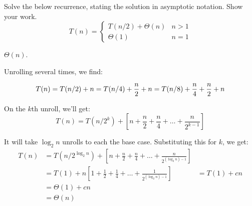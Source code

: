 \begin{prob}
    Solve the below recurrence, stating the solution in asymptotic notation. Show your work.
    \[
        T(n) =
        \begin{cases}
            T(n/2) + \Theta(n) & n > 1 \\
            \Theta(1) & n = 1
        \end{cases}
    \]

    \begin{soln}
        $\Theta(n)$.

        Unrolling several times, we find:

        \[
            T(n)
            =
                T(n/2) + n
                \\
            =
                T(n/4) + \frac{n}{2} + n
                \\
            =
                T(n/8) + \frac{n}{4} + \frac{n}{2} + n
                \\
        \]

        On the $k$th unroll, we'll get:
        \[
            T(n) = T(n/2^k) + \left[
                n + \frac{n}{2} + \frac{n}{4} + \ldots + \frac{n}{2^{k-1}}
            \right]
        \]

        It will take $\log_2 n$ unrolls to each the base case. Substituting this for
        $k$, we get:
        \[
        \begin{aligned}
            T(n)
            &= T(n/2^{\log_2 n}) + \left[
                n + \frac{n}{2} + \frac{n}{4} + \ldots + \frac{n}{2^{(\log_2 n)-1}}
            \right]
            \\
            &= T(1) + n\left[
                1 + \frac{1}{2} + \frac{1}{4} + \ldots + \frac{1}{2^{(\log_2 n)-1}}
            \right]
            & = T(1) + c n\\
            & = \Theta(1) + c n\\
            &= \Theta(n)
        \end{aligned}
        \]

    \end{soln}
\end{prob}
